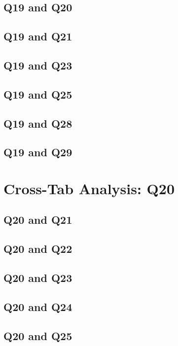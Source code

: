 \documentclass{report}
\begin{document}
\section{Q19 and Q20}\clearpage
\section{Q19 and Q21}\clearpage
\section{Q19 and Q23}\clearpage
\section{Q19 and Q25}\clearpage
\section{Q19 and Q28}\clearpage
\section{Q19 and Q29}\clearpage

\chapter{Cross-Tab Analysis: Q20}

\section{Q20 and Q21}\clearpage
\section{Q20 and Q22}\clearpage
\section{Q20 and Q23}\clearpage
\section{Q20 and Q24}\clearpage
\section{Q20 and Q25}\clearpage
\end{document}
